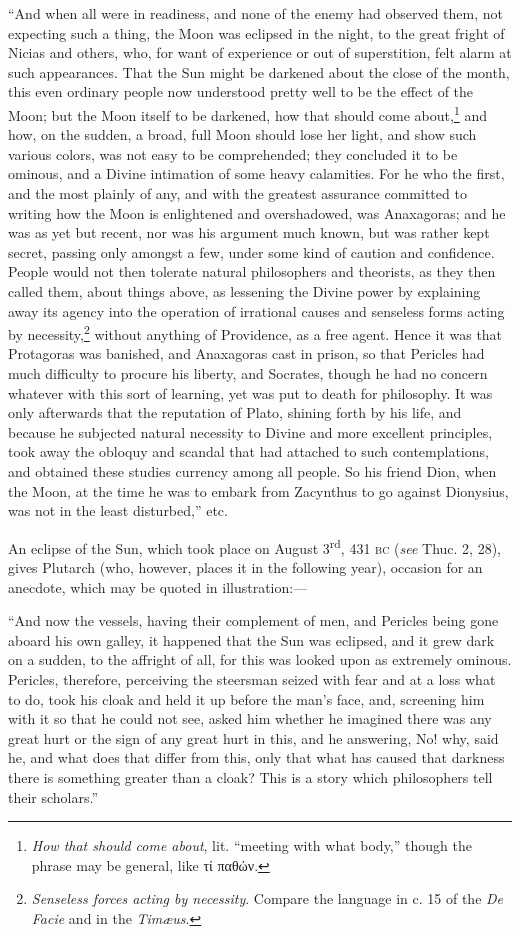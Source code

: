 \documentclass[a4paper, 11pt, oneside, polutonikogreek, english]{article}
\begin{document}
``And when all were in readiness, and none of the enemy had observed them, not expecting such a thing, the Moon was eclipsed in the night, to the great fright of Nicias and others, who, for want of experience or out of superstition, felt alarm at such appearances. That the Sun might be darkened about the close of the month, this even ordinary people now understood pretty well to be the effect of the Moon; but the Moon itself to be darkened, how that should come about,\footnote{\emph{How that should come about}, lit. ``meeting with what body,'' though the phrase may be general, like τί παθών.} and how, on the sudden, a broad, full Moon should lose her light, and show such various colors, was not easy to be comprehended; they concluded it to be ominous, and a Divine intimation of some heavy calamities. For he who the first, and the most plainly of any, and with the greatest assurance committed to writing how the Moon is enlightened and overshadowed, was Anaxagoras; and he was as yet but recent, nor was his argument much known, but was rather kept secret, passing only amongst a few, under some kind of caution and confidence. People would not then tolerate natural philosophers and theorists, as they then called them, about things above, as lessening the Divine power by explaining away its agency into the operation of irrational causes and senseless forms acting by necessity,\footnote{\emph{Senseless forces acting by necessity}. Compare the language in c. 15 of the \emph{De Facie} and in the \emph{Timæus}.} without anything of Providence, as a free agent. Hence it was that Protagoras was banished, and Anaxagoras cast in prison, so that Pericles had much difficulty to procure his liberty, and Socrates, though he had no concern whatever with this sort of learning, yet was put to death for philosophy. It was only afterwards that the reputation of Plato, shining forth by his life, and because he subjected natural necessity to Divine and more excellent principles, took away the obloquy and scandal that had attached to such contemplations, and obtained these studies currency among all people. So his friend Dion, when the Moon, at the time he was to embark from Zacynthus to go against Dionysius, was not in the least disturbed,'' etc.

An eclipse of the Sun, which took place on August 3\textsuperscript{rd}, 431 \textsc{bc} (\emph{see} Thuc. 2, 28), gives Plutarch (who, however, places it in the following year), occasion for an anecdote, which may be quoted in illustration:---

``And now the vessels, having their complement of men, and Pericles being gone aboard his own galley, it happened that the Sun was eclipsed, and it grew dark on a sudden, to the affright of all, for this was looked upon as extremely ominous. Pericles, therefore, perceiving the steersman seized with fear and at a loss what to do, took his cloak and held it up before the man's face, and, screening him with it so that he could not see, asked him whether he imagined there was any great hurt or the sign of any great hurt in this, and he answering, No! why, said he, and what does that differ from this, only that what has caused that darkness there is something greater than a cloak? This is a story which philosophers tell their scholars.''
\end{document}
